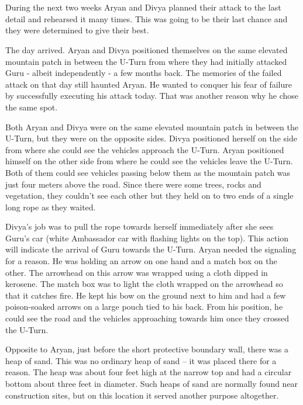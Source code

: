 \chapter{}

During the next two weeks Aryan and Divya planned their attack to the last
detail and rehearsed it many times. This was going to be their last chance and
they were determined to give their best.

The day arrived. Aryan and Divya positioned themselves on the same elevated
mountain patch in between the U-Turn from where they had initially attacked Guru
- albeit independently - a few months back. The memories of the failed attack on
that day still haunted Aryan. He wanted to conquer his fear of failure by
successfully executing his attack today. That was another reason why he chose
the same spot.

Both Aryan and Divya were on the same elevated mountain patch in between the
U-Turn, but they were on the opposite sides. Divya positioned herself on the
side from where she could see the vehicles approach the U-Turn. Aryan positioned
himself on the other side from where he could see the vehicles leave the U-Turn.
Both of them could see vehicles passing below them as the mountain patch was
just four meters above the road. Since there were some trees, rocks and
vegetation, they couldn't see each other but they held on to two ends of a
single long rope as they waited.

Divya's job was to pull the rope towards herself immediately after she sees
Guru's car (white Ambassador car with flashing lights on the top). This action
will indicate the arrival of Guru towards the U-Turn. Aryan needed the signaling
for a reason. He was holding an arrow on one hand and a match box on the other.
The arrowhead on this arrow was wrapped using a cloth dipped in kerosene. The
match box was to light the cloth wrapped on the arrowhead so that it catches
fire. He kept his bow on the ground next to him and had a few poison-soaked
arrows on a large pouch tied to his back. From his position, he could see the
road and the vehicles approaching towards him once they crossed the U-Turn.

Opposite to Aryan, just before the short protective boundary wall, there was a
heap of sand. This was no ordinary heap of sand – it was placed there for a
reason. The heap was about four feet high at the narrow top and had a circular
bottom about three feet in diameter. Such heaps of sand are normally found near
construction sites, but on this location it served another purpose altogether.

